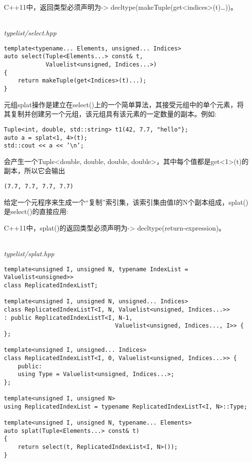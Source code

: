 \begin{tcolorbox}[colback=webgreen!5!white,colframe=webgreen!75!black]
\hspace*{0.75cm}C++11中，返回类型必须声明为-> decltype(makeTuple(get<indices>(t)…))。
\end{tcolorbox}

\hspace*{\fill} \\ %
\noindent
\textit{typelist/select.hpp}
\begin{lstlisting}[style=styleCXX]
template<typename... Elements, unsigned... Indices>
auto select(Tuple<Elements...> const& t,
			Valuelist<unsigned, Indices...>)
{
	return makeTuple(get<Indices>(t)...);
}
\end{lstlisting}

元组splat操作是建立在select()上的一个简单算法，其接受元组中的单个元素，将其复制并创建另一个元组，该元组具有该元素的一定数量的副本。例如:

\begin{lstlisting}[style=styleCXX]
Tuple<int, double, std::string> t1(42, 7.7, "hello"};
auto a = splat<1, 4>(t);
std::cout << a << ’\n’;
\end{lstlisting}

会产生一个Tuple<double, double, double, double>，其中每个值都是get<1>(t)的副本，所以它会输出

\begin{lstlisting}[style=styleCXX]
(7.7, 7.7, 7.7, 7.7)
\end{lstlisting}

给定一个元程序来生成一个“复制”索引集，该索引集由值I的N个副本组成，splat()是select()的直接应用:

\begin{tcolorbox}[colback=webgreen!5!white,colframe=webgreen!75!black]
\hspace*{0.75cm}C++11中，splat()的返回类型必须声明为-> decltype(return-expression)。
\end{tcolorbox}

\hspace*{\fill} \\ %
\noindent
\textit{typelist/splat.hpp}
\begin{lstlisting}[style=styleCXX]
template<unsigned I, unsigned N, typename IndexList = Valuelist<unsigned>>
class ReplicatedIndexListT;

template<unsigned I, unsigned N, unsigned... Indices>
class ReplicatedIndexListT<I, N, Valuelist<unsigned, Indices...>>
: public ReplicatedIndexListT<I, N-1,
								Valuelist<unsigned, Indices..., I>> {
};

template<unsigned I, unsigned... Indices>
class ReplicatedIndexListT<I, 0, Valuelist<unsigned, Indices...>> {
	public:
	using Type = Valuelist<unsigned, Indices...>;
};

template<unsigned I, unsigned N>
using ReplicatedIndexList = typename ReplicatedIndexListT<I, N>::Type;

template<unsigned I, unsigned N, typename... Elements>
auto splat(Tuple<Elements...> const& t)
{
	return select(t, ReplicatedIndexList<I, N>());
}
\end{lstlisting}

